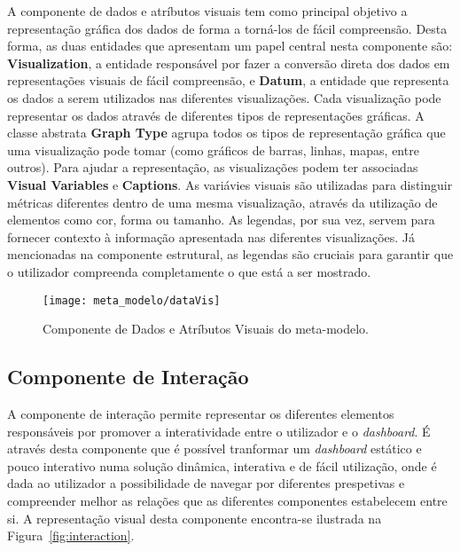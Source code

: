 A componente de dados e atríbutos visuais tem como principal objetivo a representação gráfica dos dados de forma a torná-los de fácil compreensão. Desta forma, as duas entidades que apresentam um papel central nesta componente são: \textbf{Visualization}, a entidade responsável por fazer a conversão direta dos dados em representações visuais de fácil compreensão, e \textbf{Datum}, a entidade que representa os dados a serem utilizados nas diferentes visualizações. Cada visualização pode representar os dados através de diferentes tipos de representações gráficas. A classe abstrata \textbf{Graph Type} agrupa todos os tipos de representação gráfica que uma visualização pode tomar (como gráficos de barras, linhas, mapas, entre outros). Para ajudar a representação, as visualizações podem ter associadas \textbf{Visual Variables} e \textbf{Captions}. As variávies visuais são utilizadas para distinguir métricas diferentes dentro de uma mesma visualização, através da utilização de elementos como cor, forma ou tamanho. As legendas, por sua vez, servem para fornecer contexto à informação apresentada nas diferentes visualizações. Já mencionadas na componente estrutural, as legendas são cruciais para garantir que o utilizador compreenda completamente o que está a ser mostrado.

\begin{figure}[htbp]
  \texttt{[image: meta\_modelo/dataVis]}
  \centering
  \caption{Componente de Dados e Atríbutos Visuais do meta-modelo.}
  \label{fig:comp_data_vis}
\end{figure}

\subsection{Componente de Interação} %
\label{sub:int_diagram}

A componente de interação permite representar os diferentes elementos responsáveis por promover a interatividade entre o utilizador e o \textit{dashboard}. É através desta componente que é possível tranformar um \textit{dashboard} estático e pouco interativo numa solução dinâmica, interativa e de fácil utilização, onde é dada ao utilizador a possibilidade de navegar por diferentes prespetivas e compreender melhor as relações que as diferentes componentes estabelecem entre si. A representação visual desta componente encontra-se ilustrada na Figura~\ref{fig:interaction}.

